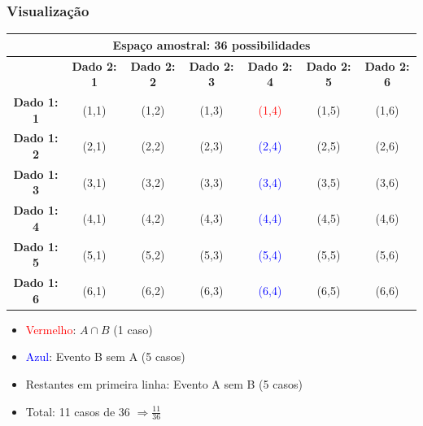 \documentclass[11pt]{beamer}
\begin{document}
\begin{frame}
\frametitle{Visualização}
\large
\begin{center}
\begin{tabular}{|c|c|c|c|c|c|c|}
\hline
\multicolumn{7}{|c|}{Espaço amostral: 36 possibilidades} \\
\hline
 & \textbf{Dado 2: 1} & \textbf{Dado 2: 2} & \textbf{Dado 2: 3} & \textbf{Dado 2: 4} & \textbf{Dado 2: 5} & \textbf{Dado 2: 6} \\
\hline
\textbf{Dado 1: 1} & (1,1) & (1,2) & (1,3) & \textcolor{red}{(1,4)} & (1,5) & (1,6) \\
\hline
\textbf{Dado 1: 2} & (2,1) & (2,2) & (2,3) & \textcolor{blue}{(2,4)} & (2,5) & (2,6) \\
\hline
\textbf{Dado 1: 3} & (3,1) & (3,2) & (3,3) & \textcolor{blue}{(3,4)} & (3,5) & (3,6) \\
\hline
\textbf{Dado 1: 4} & (4,1) & (4,2) & (4,3) & \textcolor{blue}{(4,4)} & (4,5) & (4,6) \\
\hline
\textbf{Dado 1: 5} & (5,1) & (5,2) & (5,3) & \textcolor{blue}{(5,4)} & (5,5) & (5,6) \\
\hline
\textbf{Dado 1: 6} & (6,1) & (6,2) & (6,3) & \textcolor{blue}{(6,4)} & (6,5) & (6,6) \\
\hline
\end{tabular}
\end{center}

\begin{itemize}
\item \textcolor{red}{Vermelho}: $A \cap B$ (1 caso)
\item \textcolor{blue}{Azul}: Evento B sem A (5 casos)
\item Restantes em primeira linha: Evento A sem B (5 casos)
\item Total: 11 casos de 36 $\Rightarrow \frac{11}{36}$
\end{itemize}
\end{frame}
\end{document}
